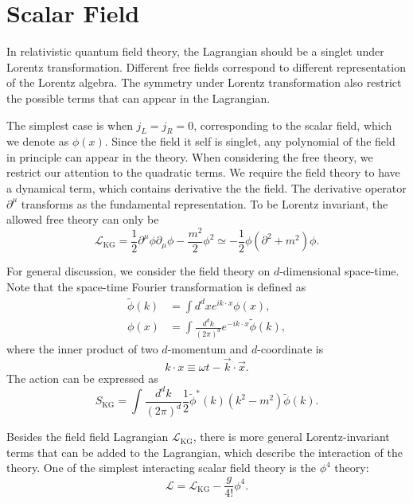 \section{Scalar Field}
In relativistic quantum field theory, the Lagrangian should be a singlet under Lorentz transformation.
Different free fields correspond to different representation of the Lorentz algebra.
The symmetry under Lorentz transformation also restrict the possible terms that can appear in the Lagrangian.

The simplest case is when $j_L=j_R = 0$, corresponding to the scalar field, which we denote as $\phi(x)$.
Since the field it self is singlet, any polynomial of the field in principle can appear in the theory.
When considering the free theory, we restrict our attention to the quadratic terms.
We require the field theory to have a dynamical term, which contains derivative the the field.
The derivative operator $\partial^\mu$ transforms as the fundamental representation.
To be Lorentz invariant, the allowed free theory can only be
\begin{equation}
	\mathcal L_{\mathrm{KG}} = \frac{1}{2}\partial^\mu \phi \partial_\mu \phi -\frac{m^2}{2}\phi^2 
	\simeq -\frac{1}{2}\phi (\partial^2+m^2) \phi.
\end{equation}

For general discussion, we consider the field theory on $d$-dimensional space-time.
Note that the space-time Fourier transformation is defined as
\begin{equation}
\begin{aligned}
	\tilde{\phi}(k) &= \int d^{d}x e^{ik\cdot x} \phi(x), \\ 
	\phi(x) &= \int \frac{d^{d}k}{(2\pi)^{d}} e^{-ik\cdot x}\tilde{\phi}(k),
\end{aligned}
\end{equation}
where the inner product of two $d$-momentum and $d$-coordinate is
\begin{equation}
	k\cdot x \equiv \omega t-\vec k\cdot \vec x.
\end{equation}
The action can be expressed as
\begin{equation}
	S_{\mathrm{KG}} = \int \frac{d^d k}{(2\pi)^d} \frac{1}{2} \tilde{\phi}^*(k)(k^2-m^2)\tilde{\phi}(k).
\end{equation}


Besides the field field Lagrangian $\mathcal L_{\mathrm{KG}}$, there is more general Lorentz-invariant terms that can be added to the Lagrangian, which describe the interaction of the theory.
One of the simplest interacting scalar field theory is the $\phi^4$ theory:
\begin{equation}
	\mathcal L = \mathcal L_{\mathrm{KG}} - \frac{g}{4!}\phi^4.
\end{equation}


